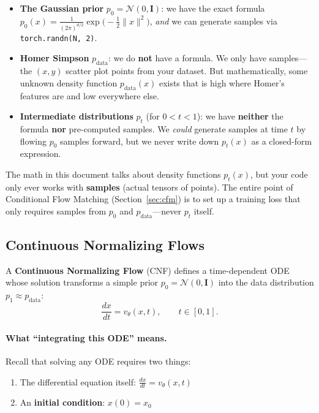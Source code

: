\documentclass[11pt, a4paper]{article}
\newcommand{\vtheta}{v_\theta}
\newcommand{\N}{\mathcal{N}}
\newcommand{\Id}{\mathbf{I}}
\begin{document}
\begin{itemize}
  \item \textbf{The Gaussian prior} $p_0 = \N(0, \Id)$:
    we have the exact formula
    $p_0(x) = \frac{1}{(2\pi)^{d/2}}\exp\!\bigl(-\tfrac{1}{2}\|x\|^2\bigr)$,
    \emph{and} we can generate samples via \texttt{torch.randn(N, 2)}.

  \item \textbf{Homer Simpson} $p_{\mathrm{data}}$:
    we do \textbf{not} have a formula.  We only have samples---the $(x,y)$
    scatter plot points from your dataset.  But mathematically, some unknown
    density function $p_{\mathrm{data}}(x)$ exists that is high where Homer's
    features are and low everywhere else.

  \item \textbf{Intermediate distributions} $p_t$ (for $0 < t < 1$):
    we have \textbf{neither} the formula \textbf{nor} pre-computed samples.
    We \emph{could} generate samples at time $t$ by flowing $p_0$ samples
    forward, but we never write down $p_t(x)$ as a closed-form expression.
\end{itemize}

\begin{warningbox}
The math in this document talks about density functions $p_t(x)$, but your
code only ever works with \textbf{samples} (actual tensors of points).
The entire point of Conditional Flow Matching (Section~\ref{sec:cfm}) is to
set up a training loss that only requires samples from $p_0$ and
$p_{\mathrm{data}}$---never $p_t$ itself.
\end{warningbox}


\subsection{Continuous Normalizing Flows}

A \textbf{Continuous Normalizing Flow} (CNF) defines a time-dependent ODE
whose solution transforms a simple prior $p_0 = \N(0,\Id)$ into the data
distribution $p_1 \approx p_{\mathrm{data}}$:
\begin{equation}
  \label{eq:ode}
  \frac{dx}{dt} = \vtheta(x, t), \qquad t \in [0, 1].
\end{equation}

\paragraph{What ``integrating this ODE'' means.}
Recall that solving any ODE requires two things:
\begin{enumerate}
  \item The differential equation itself: $\frac{dx}{dt} = \vtheta(x, t)$
  \item An \textbf{initial condition}: $x(0) = x_0$
\end{enumerate}
\end{document}
